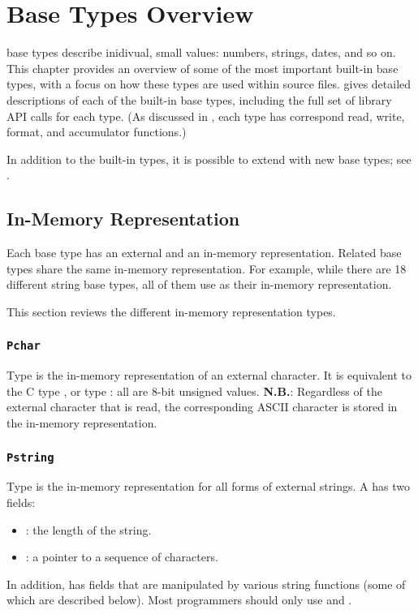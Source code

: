 \chapter{Base Types Overview}
\label{chap:base-types}

\PADSL{} base types describe inidivual, small values: numbers, strings, dates, and so on.
This chapter provides an overview of some of the most important built-in \PADSL{} base types,
with a focus on how these types are used within \PADSL{} source files.
 gives detailed descriptions of each of the built-in base types,
including the full set of library API calls for each type.  (As discussed in
, each type has correspond read, write,
format, and accumulator functions.) 

In addition to the built-in types, it is possible to extend \PADSL{} with 
new base types; see .

\section{In-Memory Representation}
\label{sec:base-types-rep}

Each base type has an external and an in-memory representation. 
Related base types share the same in-memory representation.  For
example, while there are 18 different string base types, all of them
use  as their in-memory representation.

This section reviews the different in-memory representation types.

\subsection{{\tt Pchar}}

Type  is the in-memory representation of an external
character.  It is equivalent to the C type , or type
: all are 8-bit unsigned values.  {\bf N.B.}: Regardless of the
external character that is read, the corresponding ASCII character is stored in 
the in-memory representation.

\subsection{{\tt Pstring}}

Type  is the in-memory representation for all forms of
external strings.  A   has two fields:
\begin{itemize}
\item {} : the length of the string.
\item {} : a pointer to a sequence of  characters.
\end{itemize}
In addition,  has fields that are manipulated
by various string functions (some of which are described below).
Most programmers should only use  and .

